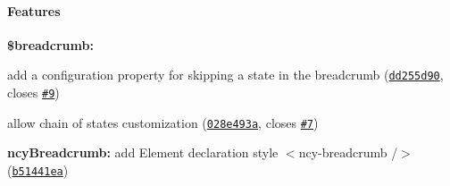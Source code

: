 {\bfseries \paragraph*{Features}}

{\bfseries }

{\bfseries 
\begin{DoxyItemize}
\item {\bfseries \$breadcrumb\+:}
\begin{DoxyItemize}
\item add a configuration property for skipping a state in the breadcrumb (\href{http://github.com/ncuillery/angular-breadcrumb/commit/dd255d906c4231f44b48f066d4db197a9c6b9e27}{\tt dd255d90}, closes \href{http://github.com/ncuillery/angular-breadcrumb/issues/9}{\tt \#9})
\item allow chain of states customization (\href{http://github.com/ncuillery/angular-breadcrumb/commit/028e493a1ebcae5ae60b8a9d42b949262000d7df}{\tt 028e493a}, closes \href{http://github.com/ncuillery/angular-breadcrumb/issues/7}{\tt \#7})
\end{DoxyItemize}
\item {\bfseries ncy\+Breadcrumb\+:} add \textquotesingle{}Element\textquotesingle{} declaration style \textquotesingle{}$<$ncy-\/breadcrumb /$>$\textquotesingle{} (\href{http://github.com/ncuillery/angular-breadcrumb/commit/b51441eafb1659b782fea1f8668c7f455e1d6b4d}{\tt b51441ea}) 
\end{DoxyItemize}}